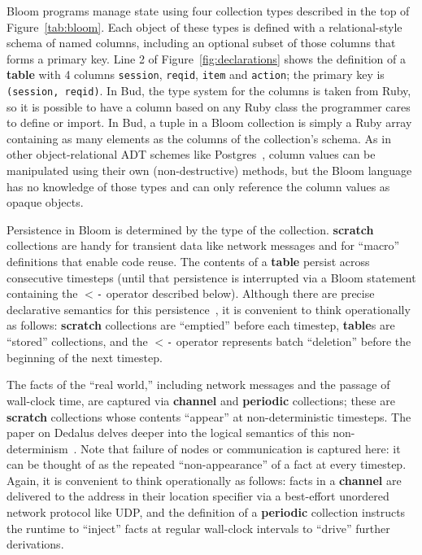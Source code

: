 Bloom programs manage state using four collection types described in the top of
Figure~\ref{tab:bloom}. Each object of these types is defined with a
relational-style schema of named columns, including an optional subset of those
columns that forms a primary key.  Line 2 of Figure~\ref{fig:declarations}
shows the definition of a \textbf{table} with 4 columns \texttt{session},
\texttt{reqid}, \texttt{item} and \texttt{action}; the primary key is
\texttt{(session, reqid)}. In Bud, the type system for the columns is taken
from Ruby, so it is possible to have a column based on any Ruby class the
programmer cares to define or import.  In Bud, a tuple in a Bloom collection is
simply a Ruby array containing as many elements as the columns of the
collection's schema.  As in other object-relational ADT schemes like
Postgres~\cite{postgres-adt}, column values can be manipulated using their own
(non-destructive) methods, but the Bloom language has no knowledge of those
types and can only reference the column values as opaque objects.  

Persistence in Bloom is determined by the type of the collection.
\textbf{scratch} collections are handy for transient data like network messages
and for ``macro'' definitions that enable code reuse. The contents of a
\textbf{table} persist across consecutive timesteps (until that persistence is
interrupted via a Bloom statement containing the \texttt{$<$-} operator
described below). Although there are precise declarative semantics for this
persistence~\cite{dedalus-techr}, it is convenient to think operationally as
follows: \textbf{scratch} collections are ``emptied'' before each timestep,
\textbf{table}s are ``stored'' collections, and the \texttt{$<$-} operator
represents batch ``deletion'' before the beginning of the next timestep.

The facts of the ``real world,'' including network messages and the passage of
wall-clock time, are captured via \textbf{channel} and \textbf{periodic}
collections; these are \textbf{scratch} collections whose contents ``appear''
at non-deterministic timesteps. 
The paper on Dedalus delves deeper into the logical semantics of this
non-determinism~\cite{dedalus-techr}.  Note that failure of nodes or
communication is captured here: it can be thought of as the repeated
``non-appearance'' of a fact at every timestep.  Again, it is convenient to
think operationally as follows: facts in a \textbf{channel} are delivered to
the address in their location specifier via a best-effort unordered network
protocol like UDP, and the definition of a \textbf{periodic} collection
instructs the runtime to ``inject'' facts at regular wall-clock intervals to
``drive'' further derivations.


